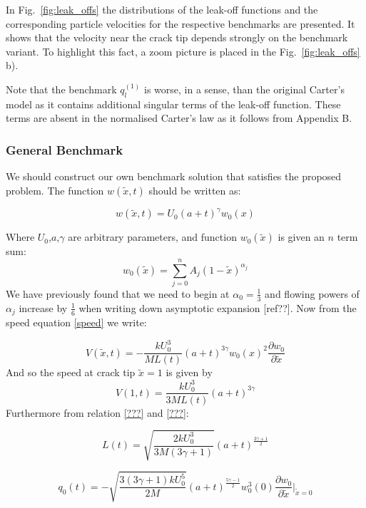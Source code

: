 In Fig.~\ref{fig:leak_offs} the distributions  of the leak-off functions and the corresponding particle velocities for the respective benchmarks are presented.
It shows that the velocity near the crack tip depends strongly on the benchmark variant. To highlight this fact, a zoom picture is placed in the Fig.~\ref{fig:leak_offs} b).

Note that the benchmark $q_l^{(1)}$ is worse, in a sense, than the original Carter's model as it contains additional singular terms of the leak-off function.
These terms are absent in the normalised Carter's law as it follows from Appendix B.

\subsubsection{General Benchmark}
We should construct our own benchmark solution that satisfies the proposed problem. The function $w(\tilde x,t)$ should be written as: 
  
\begin{equation}\label{w_bench}
w(\tilde x,t)=U_0(a+t)^\gamma w_0(x)
\end{equation}

Where $U_0$,$a$,$\gamma$ are arbitrary parameters, and function $w_0(\tilde x)$ is given an $n$ term sum:
\begin{equation}\label{w_bench}
w_0(\tilde x)=\sum_{j=0}^n A_j(1-\tilde x)^{\alpha_j}
\end{equation}
We have previously found that we need to begin at $\alpha_{0}=\frac{1}{3}$ and flowing powers of $\alpha_j$ increase by $\frac{1}{6}$ when writing down asymptotic expansion [ref??]. Now from the speed equation \eqref{speed} we write:

\begin{equation}\label{v_bench}
V(\tilde x,t)=-\frac{kU_0^3}{ML(t)}(a+t)^{3\gamma}w_0(x)^2\frac{\partial w_0}{\partial \tilde x}
\end{equation}
And so the speed at crack tip $\tilde x=1$ is given by
\begin{equation}\label{v_1_bench}
V(1,t)=\frac{k U_0^3}{3ML(t)}(a+t)^{3\gamma}
\end{equation}
Furthermore from relation \eqref{???}  and \eqref{???}:

\begin{equation}\label{L_bench}
L(t)=\sqrt{\frac{2kU_0^3}{3M(3\gamma+1)}}(a+t)^{\frac{3\gamma+1}{2}}
\end{equation}

\begin{equation}\label{q_0_bench}
q_0(t)=-\sqrt{\frac{3(3\gamma+1)kU_0^5}{2M}}(a+t)^{\frac{5\gamma-1}{2}}w_0^3(0)\frac{\partial w_0}{\partial \tilde x}|_{\tilde x=0}
\end{equation}

